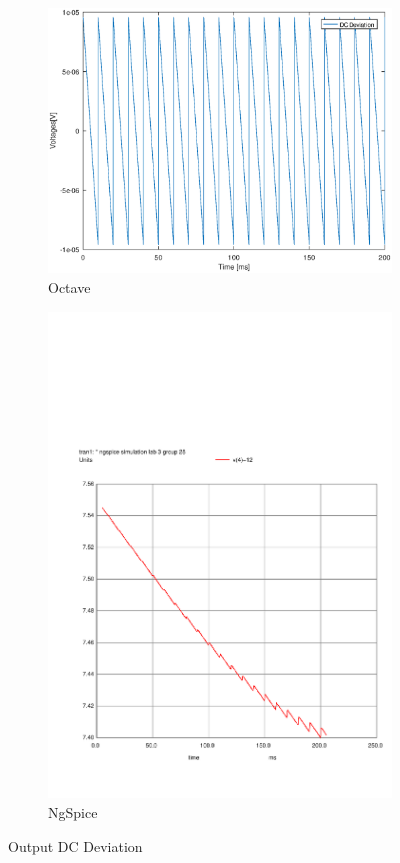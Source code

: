 \begin{figure}[H] 
\centering
\begin{subfigure}{0.4\textwidth}
\includegraphics[width=\textwidth]{DCDeviation.eps}
\caption{Octave}
\label{fig:first}
\end{subfigure}
\begin{subfigure}{0.3\textwidth}
\includegraphics[width=\textwidth]{sim31.pdf}
\caption{NgSpice}
\label{fig:second}
\end{subfigure}
\caption{Output DC Deviation}
\end{figure}

